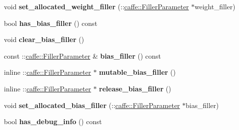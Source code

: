 \begin{DoxyCompactItemize}
\item 
\mbox{\label{classcaffe_1_1_recurrent_parameter_aae3ea629899ddc3b7d39c0cea9bf7364}} 
void {\bfseries set\+\_\+allocated\+\_\+weight\+\_\+filler} (\+::\mbox{\hyperlink{classcaffe_1_1_filler_parameter}{caffe\+::\+Filler\+Parameter}} $\ast$weight\+\_\+filler)
\item 
\mbox{\label{classcaffe_1_1_recurrent_parameter_a6f0aba5f3c029c60af99535fa06e718c}} 
bool {\bfseries has\+\_\+bias\+\_\+filler} () const
\item 
\mbox{\label{classcaffe_1_1_recurrent_parameter_a14a000ec699c6c1ffb29682573723134}} 
void {\bfseries clear\+\_\+bias\+\_\+filler} ()
\item 
\mbox{\label{classcaffe_1_1_recurrent_parameter_a1cebb5cfbdf337c44be5e2b05e7df917}} 
const \+::\mbox{\hyperlink{classcaffe_1_1_filler_parameter}{caffe\+::\+Filler\+Parameter}} \& {\bfseries bias\+\_\+filler} () const
\item 
\mbox{\label{classcaffe_1_1_recurrent_parameter_aa5d4f3753a75184429938e4275461efc}} 
inline \+::\mbox{\hyperlink{classcaffe_1_1_filler_parameter}{caffe\+::\+Filler\+Parameter}} $\ast$ {\bfseries mutable\+\_\+bias\+\_\+filler} ()
\item 
\mbox{\label{classcaffe_1_1_recurrent_parameter_a30aa2296fe7583c1345743558df7e1b2}} 
inline \+::\mbox{\hyperlink{classcaffe_1_1_filler_parameter}{caffe\+::\+Filler\+Parameter}} $\ast$ {\bfseries release\+\_\+bias\+\_\+filler} ()
\item 
\mbox{\label{classcaffe_1_1_recurrent_parameter_a168299536034d5ddb6abff46e36016e8}} 
void {\bfseries set\+\_\+allocated\+\_\+bias\+\_\+filler} (\+::\mbox{\hyperlink{classcaffe_1_1_filler_parameter}{caffe\+::\+Filler\+Parameter}} $\ast$bias\+\_\+filler)
\item 
\mbox{\label{classcaffe_1_1_recurrent_parameter_a93c3e87a394cc21e9b2f538a7e74315d}} 
bool {\bfseries has\+\_\+debug\+\_\+info} () const

\end{DoxyCompactItemize}
